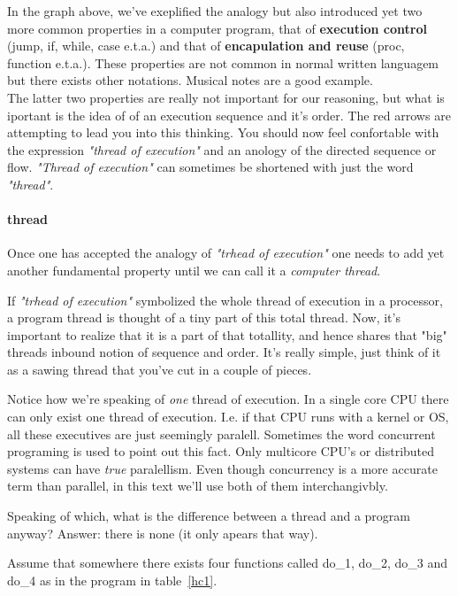 	In the graph above, we've exeplified the analogy but also introduced yet two more common properties in a computer program, that of \textbf{execution control} (jump, if, while, case e.t.a.) and that of \textbf{encapulation and reuse} (proc, function e.t.a.). These properties are not common in normal written languagem but there exists other notations. Musical notes are a good example.
\\
	The latter two properties are really not important for our reasoning, but what is iportant is the idea of of an execution sequence and it's order. The red arrows are attempting to lead you into this thinking. You should now feel confortable with the expression \textit{"thread of execution"} and an anology of the directed sequence or flow. \textit{"Thread of execution"} can sometimes be shortened with just the word \textit{"thread"}.

	\paragraph{thread}
	\label{genesis_thread}
		Once one has accepted the analogy of \textit{"trhead of execution"} one needs to add yet another fundamental property until we can call it a \textit{computer thread}.

		If \textit{"trhead of execution"} symbolized the whole thread of execution in a processor, a program thread is thought of a tiny part of this total thread. Now, it's important to realize that it is a part of that totallity, and hence shares that "big" threads inbound notion of sequence and order. It's really simple, just think of it as a sawing thread that you've cut in a couple of pieces.

		Notice how we're speaking of \textit{one} thread of execution. In a single core CPU there can only exist one thread of execution. I.e. if that CPU runs with a kernel or OS, all these executives are just seemingly paralell. Sometimes the word concurrent programing is used to point out this fact. Only multicore CPU's or distributed systems can have \textit{true} paralellism. Even though concurrency is  a more accurate term than parallel, in this text we'll use both of them interchangivbly.

		Speaking of which, what is the difference between a thread and a program anyway?
		Answer: there is none (it only apears that way).

		Assume that somewhere there exists four functions called  do\_1, do\_2, do\_3 and do\_4 as in the program in table~\ref{hc1}.

